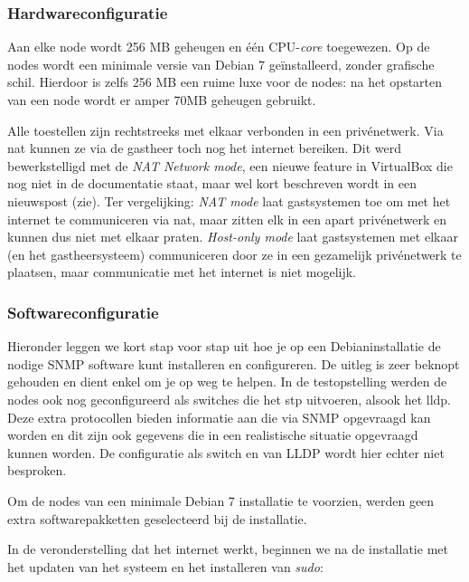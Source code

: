 \subsubsection{Hardwareconfiguratie}

Aan elke node wordt 256 MB geheugen en één CPU-\textit{core} toegewezen.
Op de nodes wordt een minimale versie van Debian 7 geïnstalleerd, zonder grafische schil.
Hierdoor is zelfs 256 MB een ruime luxe voor de nodes: na het opstarten van een node wordt er amper 70MB geheugen gebruikt.

Alle toestellen zijn rechtstreeks met elkaar verbonden in een privénetwerk.
Via \gls{nat} kunnen ze via de gastheer toch nog het internet bereiken.
Dit werd bewerkstelligd met de \textit{NAT Network mode},
een nieuwe feature in VirtualBox die nog niet in de documentatie staat, maar wel kort beschreven wordt in een nieuwspost (zie\cite{vbox-nat-network-mode}).
Ter vergelijking:
\textit{NAT mode} laat gastsystemen toe om met het internet te communiceren via \gls{nat}, maar zitten elk in een apart privénetwerk en kunnen dus niet met elkaar praten.
\textit{Host-only mode} laat gastsystemen met elkaar (en het gastheersysteem) communiceren door ze in een gezamelijk privénetwerk te plaatsen, 
maar communicatie met het internet is niet mogelijk.

\subsubsection{Softwareconfiguratie}

Hieronder leggen we kort stap voor stap uit hoe je op een Debianinstallatie de nodige SNMP software kunt installeren en configureren.
De uitleg is zeer beknopt gehouden en dient enkel om je op weg te helpen.
In de testopstelling werden de nodes ook nog geconfigureerd als switches die het \gls{stp} uitvoeren, alsook het \gls{lldp}.
Deze extra protocollen bieden informatie aan die via SNMP opgevraagd kan worden en dit zijn ook gegevens die in een realistische situatie opgevraagd kunnen worden.
De configuratie als switch en van LLDP wordt hier echter niet besproken. 

Om de nodes van een minimale Debian 7 installatie te voorzien, werden geen extra softwarepakketten geselecteerd bij de installatie.

In de veronderstelling dat het internet werkt, beginnen we na de installatie met het updaten van het systeem en het installeren van \textit{sudo}:

